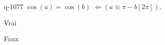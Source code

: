 \begin{truefalse}{q-1077}
$\cos(a)=\cos(b)$  $\Leftarrow \left(a\equiv \pi-b [2\pi]\right)$.
\item Vrai
\item* Faux
\end{truefalse}

